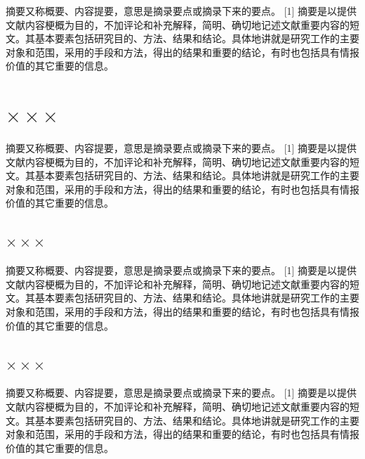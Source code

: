 \documentclass[12pt,oneside,a4paper,fleqn]{ctexart}
\begin{document}
\begin{spacing}{1.25}
摘要又称概要、内容提要，意思是摘录要点或摘录下来的要点。 [1]  摘要是以提供文献内容梗概为目的，不加评论和补充解释，简明、确切地记述文献重要内容的短文。其基本要素包括研究目的、方法、结果和结论。具体地讲就是研究工作的主要对象和范围，采用的手段和方法，得出的结果和重要的结论，有时也包括具有情报价值的其它重要的信息。

\end{spacing}\vspace{0.5em} {\heiti \section{ $\times \times \times $}} \vspace{0.5em}\begin{spacing}{1.25}

摘要又称概要、内容提要，意思是摘录要点或摘录下来的要点。 [1]  摘要是以提供文献内容梗概为目的，不加评论和补充解释，简明、确切地记述文献重要内容的短文。其基本要素包括研究目的、方法、结果和结论。具体地讲就是研究工作的主要对象和范围，采用的手段和方法，得出的结果和重要的结论，有时也包括具有情报价值的其它重要的信息。

\end{spacing}\vspace{0.5em} {\heiti \subsection{ $\times \times \times $}}\begin{spacing}{1.25}

摘要又称概要、内容提要，意思是摘录要点或摘录下来的要点。 [1]  摘要是以提供文献内容梗概为目的，不加评论和补充解释，简明、确切地记述文献重要内容的短文。其基本要素包括研究目的、方法、结果和结论。具体地讲就是研究工作的主要对象和范围，采用的手段和方法，得出的结果和重要的结论，有时也包括具有情报价值的其它重要的信息。



\end{spacing}\vspace{0.5em} {\heiti \subsection{ $\times \times \times $}}\begin{spacing}{1.25}

摘要又称概要、内容提要，意思是摘录要点或摘录下来的要点。 [1]  摘要是以提供文献内容梗概为目的，不加评论和补充解释，简明、确切地记述文献重要内容的短文。其基本要素包括研究目的、方法、结果和结论。具体地讲就是研究工作的主要对象和范围，采用的手段和方法，得出的结果和重要的结论，有时也包括具有情报价值的其它重要的信息。


\end{spacing}
\end{document}
